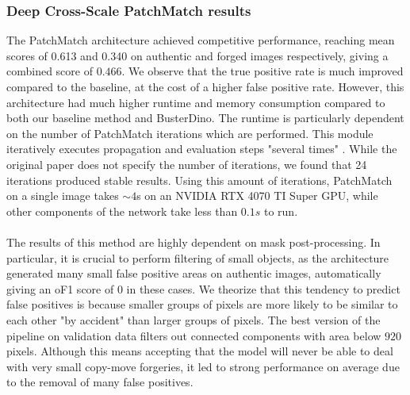 \documentclass[final]{nldl}
\begin{document}
\subsubsection{Deep Cross-Scale PatchMatch results}
The PatchMatch architecture achieved competitive performance, reaching mean scores of 0.613 and 0.340 on authentic and forged images respectively, giving a combined score of $0.466$. We observe that the true positive rate is much improved compared to the baseline, at the cost of a higher false positive rate. However, this architecture had much higher runtime and memory consumption compared to both our baseline method and BusterDino. The runtime is particularly dependent on the number of PatchMatch iterations which are performed. This module iteratively executes propagation and evaluation steps "several times" \cite[p.~7]{li2024deeppatchmatch}. While the original paper does not specify the number of iterations, we found that 24 iterations produced stable results. Using this amount of iterations, PatchMatch on a single image takes $\sim 4$s on an NVIDIA RTX 4070 TI Super GPU, while other components of the network take less than $0.1s$ to run.
\\\\
The results of this method are highly dependent on mask post-processing. In particular, it is crucial to perform filtering of small objects, as the architecture generated many small false positive areas on authentic images, automatically giving an oF1 score of $0$ in these cases. We theorize that this tendency to predict false positives is because smaller groups of pixels are more likely to be similar to each other "by accident" than larger groups of pixels. The best version of the pipeline on validation data filters out connected components with area below $920$ pixels. Although this means accepting that the model will never be able to deal with very small copy-move forgeries, it led to strong performance on average due to the removal of many false positives.
\end{document}
